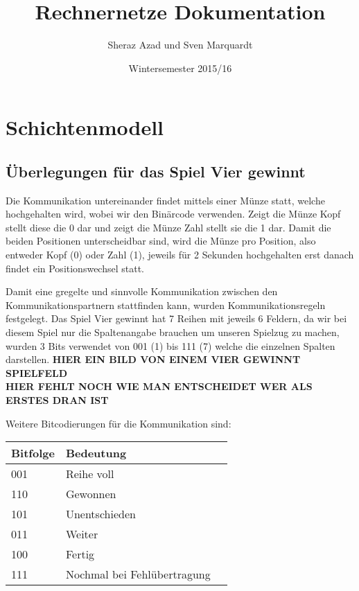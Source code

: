 \documentclass{scrartcl}
\begin{document}
  \title{Rechnernetze Dokumentation}
  \author{Sheraz Azad und Sven Marquardt}
  \date{Wintersemester 2015/16}
  \maketitle
  
  \tableofcontents
 
  \newpage
\section[Versuch 1 Schichtenmodell]{Schichtenmodell}  
  \subsection[Aufgabe 2 Überlegungen für das Spiel Vier gewinnt]{Überlegungen für das Spiel Vier gewinnt}
  
  Die Kommunikation untereinander findet mittels einer Münze statt, welche hochgehalten wird, wobei wir den Binärcode verwenden. Zeigt die Münze Kopf stellt diese die 0 dar und zeigt die Münze Zahl stellt sie die 1 dar. Damit die beiden Positionen unterscheidbar sind, wird die Münze pro Position, also entweder Kopf (0) oder Zahl (1), jeweils für 2 Sekunden hochgehalten erst danach findet ein Positionswechsel statt.
    
  Damit eine gregelte und sinnvolle Kommunikation zwischen den Kommunikationspartnern stattfinden kann, wurden Kommunikationsregeln festgelegt. Das Spiel Vier gewinnt hat 7 Reihen mit jeweils 6 Feldern, da wir bei diesem Spiel nur die Spaltenangabe brauchen um unseren Spielzug zu machen, wurden 3 Bits verwendet von 001 (1) bis 111 (7) welche die einzelnen Spalten darstellen.
  \textbf{HIER EIN BILD VON EINEM VIER GEWINNT SPIELFELD}\\
  \textbf{HIER FEHLT NOCH WIE MAN ENTSCHEIDET WER ALS ERSTES DRAN IST}
  
  Weitere Bitcodierungen für die Kommunikation sind:

   \begin{table}
    \centering
    \begin{tabular}{l||lr}
      \textbf{Bitfolge} & \textbf{Bedeutung} \\ \hline
        001 & Reihe voll \\
      110 & Gewonnen \\
      101 & Unentschieden \\
      011 & Weiter \\
      100 & Fertig \\
      111 & Nochmal bei Fehlübertragung 
    \end{tabular}
    \end{table}
  
\end{document}
